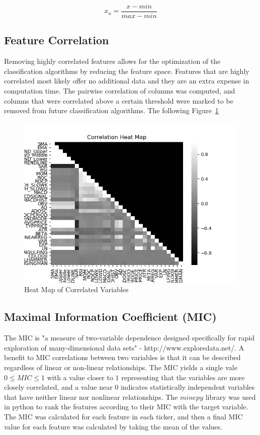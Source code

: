 \documentclass{article}
\begin{document}
\begin{equation}\label{eq:norm}
	x_n = \frac{x - min}{max - min}
\end{equation}

\subsection{Feature Correlation}
Removing highly correlated features allows for the optimization of the classification algorithms by reducing the feature space. Features that are highly correlated most likely offer no additional data and they are an extra expense in computation time. The pairwise correlation of columns was computed, and columns that were correlated above a certain threshold were marked to be removed from future classification algorithms. The following Figure~\ref{fig:corr_heatmap}

\begin{figure}[h!]
	\centering
	\includegraphics[width=\linewidth]{data/heatmapT1.png}
	\caption{Heat Map of Correlated Variables}
	\label{fig:corr_heatmap}
\end{figure}

\subsection{Maximal Information Coefficient (MIC)}
The MIC is "a measure of two-variable dependence designed specifically for rapid exploration of many-dimensional data sets" - http://www.exploredata.net/. A benefit to MIC correlations between two variables is that it can be described regardless of linear or non-linear relationships. The MIC yields a single vale $0 \leq MIC \leq 1$ with a value closer to $1$ representing that the variables are more closely correlated, and a value near $0$ indicates statistically independent variables that have neither linear nor nonlinear relationships. The $minepy$ library was used in python to rank the features according to their MIC with the target variable. The MIC was calculated for each feature in each ticker, and then a final MIC value for each feature was calculated by taking the mean of the values.
\end{document}
